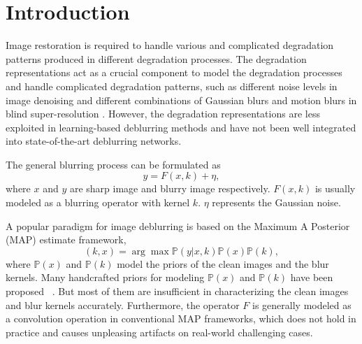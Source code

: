 \documentclass[runningheads]{llncs}
\begin{document}
\section{Introduction}
\label{sec:intro}
Image restoration is required to handle various and complicated degradation patterns produced in different degradation processes. The degradation representations act as a crucial component to model the degradation processes and handle complicated degradation patterns, such as different noise levels in image denoising \cite{zhang2018ffdnet,Guo2019Cbdnet,MildenhallKPN18} and different combinations of Gaussian blurs and motion blurs in blind super-resolution \cite{unsupervised_degradation}. 
However, the degradation representations are less exploited in learning-based deblurring methods and have not been well integrated into state-of-the-art deblurring networks.

The general blurring process can be formulated as
\begin{equation}
    y = F(x, k) + \eta,
\end{equation}
where $x$ and $y$ are sharp image and blurry image respectively.  $F(x,k)$ is usually modeled as a blurring operator with kernel $k$. $\eta$ represents the Gaussian noise.

A popular paradigm for image deblurring is based on the Maximum A Posterior (MAP) estimate framework,
\begin{equation}
    (k, x) = \arg \max \mathbb{P}(y|x,k)\mathbb{P}(x)\mathbb{P}(k),
\end{equation}
where $\mathbb{P}(x)$ and $\mathbb{P}(k)$ model the priors of the clean images and the blur kernels. 
Many handcrafted priors for modeling $\mathbb{P}(x)$ and $\mathbb{P}(k)$ have been proposed ~\cite{blind_dark_channel,blind_spectral,hyper_laplacian,total_variation}. But most of them are insufficient in characterizing the clean images and blur kernels accurately. 
Furthermore, the operator $F$ is generally modeled as a convolution operation in conventional MAP frameworks, which does not hold in practice and causes unpleasing artifacts on real-world challenging cases.
\end{document}

